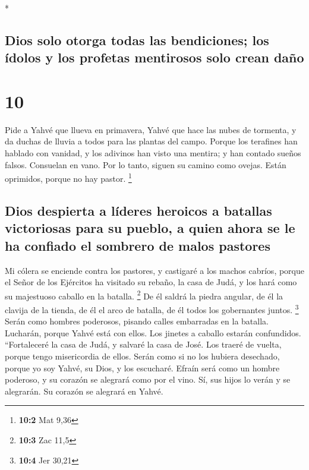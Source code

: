 \begin{paracol}{2}
\begin{otherlanguage}{english}
\end{otherlanguage}

\switchcolumn[0]*

\hypertarget{dios-solo-otorga-todas-las-bendiciones-los-uxeddolos-y-los-profetas-mentirosos-solo-crean-dauxf1o}{%
\subsection{Dios solo otorga todas las bendiciones; los ídolos y los
profetas mentirosos solo crean
daño}\label{dios-solo-otorga-todas-las-bendiciones-los-uxeddolos-y-los-profetas-mentirosos-solo-crean-dauxf1o}}

\hypertarget{section-18}{%
\section{10}\label{section-18}}

 Pide a Yahvé que llueva en primavera, Yahvé que hace las
nubes de tormenta, y da duchas de lluvia a todos para las plantas del
campo.  Porque los terafines han hablado con vanidad, y
los adivinos han visto una mentira; y han contado sueños falsos.
Consuelan en vano. Por lo tanto, siguen su camino como ovejas. Están
oprimidos, porque no hay pastor. \footnote{\textbf{10:2} Mat 9,36}

\hypertarget{dios-despierta-a-luxedderes-heroicos-a-batallas-victoriosas-para-su-pueblo-a-quien-ahora-se-le-ha-confiado-el-sombrero-de-malos-pastores}{%
\subsection{Dios despierta a líderes heroicos a batallas victoriosas
para su pueblo, a quien ahora se le ha confiado el sombrero de malos
pastores}\label{dios-despierta-a-luxedderes-heroicos-a-batallas-victoriosas-para-su-pueblo-a-quien-ahora-se-le-ha-confiado-el-sombrero-de-malos-pastores}}

 Mi cólera se enciende contra los pastores, y castigaré a
los machos cabríos, porque el Señor de los Ejércitos ha visitado su
rebaño, la casa de Judá, y los hará como su majestuoso caballo en la
batalla. \footnote{\textbf{10:3} Zac 11,5}  De él saldrá
la piedra angular, de él la clavija de la tienda, de él el arco de
batalla, de él todos los gobernantes juntos. \footnote{\textbf{10:4} Jer
  30,21}  Serán como hombres poderosos, pisando calles
embarradas en la batalla. Lucharán, porque Yahvé está con ellos. Los
jinetes a caballo estarán confundidos.  ``Fortaleceré la
casa de Judá, y salvaré la casa de José. Los traeré de vuelta, porque
tengo misericordia de ellos. Serán como si no los hubiera desechado,
porque yo soy Yahvé, su Dios, y los escucharé.  Efraín
será como un hombre poderoso, y su corazón se alegrará como por el vino.
Sí, sus hijos lo verán y se alegrarán. Su corazón se alegrará en Yahvé.


\end{paracol}
